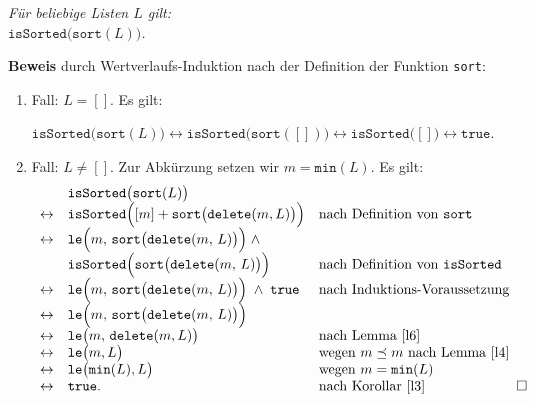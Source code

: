 \begin{Proposition} 
{\em 
  F\"ur beliebige Listen $L$ gilt: \\[0.1cm]
  \hspace*{1.3cm} $\mathtt{isSorted}\bigl(\mathtt{sort}(L)\bigr)$.
}
\end{Proposition}
\textbf{Beweis} durch Wertverlaufs-Induktion nach der Definition der Funktion \texttt{sort}:
\begin{enumerate}
\item Fall: $L=[]$.  Es gilt:

      \hspace*{1.3cm} 
       $\mathtt{isSorted}\bigl(\mathtt{sort}(L)\bigr) \leftrightarrow \mathtt{isSorted}\bigl(\mathtt{sort}([])\bigr) \leftrightarrow
          \mathtt{isSorted}\bigl([]\bigr) \leftrightarrow \mathtt{true}$.
\item Fall: $L \not= []$. Zur Abk\"urzung setzen wir $m = \mathtt{min}(L)$.  Es gilt:
      \[
      \begin{array}[b]{cll}
          & \mathtt{isSorted}\bigl(\mathtt{sort}(L)\bigr) \\ 
        \leftrightarrow & \mathtt{isSorted}\Bigl([m] + \mathtt{sort}\bigl(\mathtt{delete}(m,L)\bigr)\Bigr) &
                          \mbox{nach Definition von \texttt{sort}}     \\
        \leftrightarrow & \mathtt{le}\Bigl(m,\, \mathtt{sort}\bigl(\mathtt{delete}(m,\,L)\bigr)\Bigr) \;\wedge\; \\
                        & \mathtt{isSorted}\Bigl(\mathtt{sort}\bigl(\mathtt{delete}(m,\,L)\bigr)\Bigr) & 
                          \mbox{nach Definition von \texttt{isSorted}}     \\
        \leftrightarrow & \mathtt{le}\Bigl(m,\, \mathtt{sort}\bigl(\mathtt{delete}(m,\,L)\bigr)\Bigr) \;\wedge\;
                          \mathtt{true} &
                          \mbox{nach Induktions-Voraussetzung}     \\
        \leftrightarrow & \mathtt{le}\Bigl(m,\, \mathtt{sort}\bigl(\mathtt{delete}(m,\,L)\bigr)\Bigr) \\
        \leftrightarrow & \mathtt{le}\bigl(m,\, \mathtt{delete}(m,L)\bigr) &
                          \mbox{nach Lemma \ref{l6}}     \\
        \leftrightarrow & \mathtt{le}\bigl(m, L\bigr) &
                          \mbox{wegen $m \preceq m$ nach Lemma \ref{l4}}     \\
        \leftrightarrow & \mathtt{le}\bigl(\mathtt{min}(L), L\bigr) &
                          \mbox{wegen $m = \mathtt{min}(L)$}     \\
        \leftrightarrow & \mathtt{true}. &
                          \mbox{nach Korollar \ref{l3}}     
      \end{array}\hspace*{\fill} \Box
      \]
\end{enumerate}

